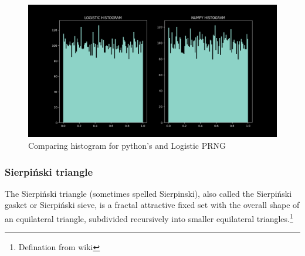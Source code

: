 \documentclass{report}
\begin{document}
\begin{figure}[!h]
    \centering
    \includegraphics[scale=.45]{images/rndHist.png}
    \caption{Comparing histogram for python's and Logistic PRNG}
    \label{fig:my_label10}
\end{figure}
\newpage

\subsubsection{Sierpiński triangle}
The Sierpiński triangle (sometimes spelled Sierpinski), also called the Sierpiński gasket or Sierpiński sieve, is a fractal attractive fixed set with the overall shape of an equilateral triangle, subdivided recursively into smaller equilateral triangles.\footnote[1]{Defination from wiki}
\end{document}
